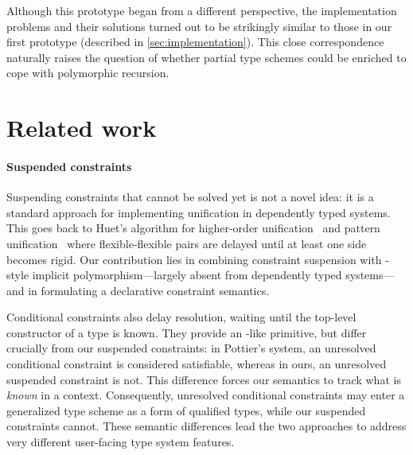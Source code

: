 \documentclass[acmsmall,screen,nonacm%
\Anonymous{,anonymous}{}%
\Final{}{,review}%
]{acmart}
\begin{document}

Although this prototype began from a different perspective, the implementation
problems and their solutions turned out to be strikingly similar to those in
our first prototype (described in \cref{sec:implementation}). This close
correspondence naturally raises the question of whether partial type schemes
could be enriched to cope with polymorphic recursion.

\section{Related work}
\label{sec:related-work}

\paragraph{Suspended constraints}

Suspending constraints that cannot be solved yet is not a novel idea: it is a
standard approach for implementing unification in dependently typed systems. This goes
back to Huet's algorithm for higher-order unification~\citep*{huet-unif} and
pattern unification~\citep*{Miller/pattern-unif@iclp91} where flexible-flexible
pairs are delayed until at least one side becomes rigid.
%
Our contribution lies in combining constraint suspension with \ML-style
implicit polymorphism---largely absent from dependently typed systems---and in
formulating a declarative constraint semantics.

Conditional constraints \citep*{journals/njc/Pottier00} also delay resolution,
waiting until the top-level constructor of a type is known. They provide an
-like primitive, but differ crucially from our suspended
constraints: in Pottier's system, an unresolved conditional constraint is
considered satisfiable, whereas in ours, an unresolved suspended constraint is
not. This difference forces our semantics to track what is \emph{known} in a
context. Consequently, unresolved conditional constraints may enter a
generalized type scheme as a form of qualified types, while our suspended
constraints cannot. These semantic differences lead the two approaches to
address very different user-facing type system features.
\end{document}
